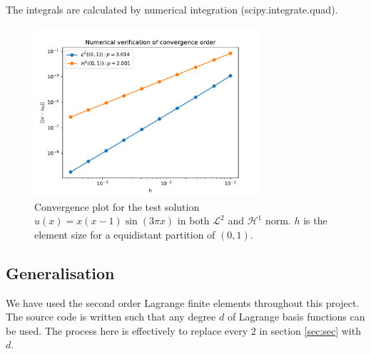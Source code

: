 The integrals are calculated by
numerical integration (scipy.integrate.quad).


\begin{figure}
  \centering
  \includegraphics[width=0.75\textwidth]{Images/plots/task1_conv_plot.pdf}
  \caption{Convergence plot for the test solution
  \( u(x) = x(x-1)\sin(3\pi x) \) in both
  \( \mathcal{L}^2 \) and \( \mathcal{H}^1 \) norm.
\( h \) is the element size for a equidistant partition of \( (0, 1) \).}
  \label{fig:conv_plot}
\end{figure}

\subsection{Generalisation}

We have used the second order Lagrange finite elements
throughout this project. The source code is written
such that any degree \( d \) of Lagrange basis functions can be used.
The process here is effectively to replace every 
\( 2 \) in section \ref{sec:sec} with \( d \).

